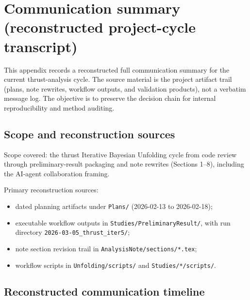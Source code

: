\section{Communication summary (reconstructed project-cycle transcript)}
\label{sec:app_communication_summary}

This appendix records a reconstructed full communication summary for the current thrust-analysis cycle.
The source material is the project artifact trail (plans, note rewrites, workflow outputs, and validation products), not a verbatim message log.
The objective is to preserve the decision chain for internal reproducibility and method auditing.

\subsection{Scope and reconstruction sources}

Scope covered: the thrust Iterative Bayesian Unfolding cycle from code review through preliminary-result packaging and note rewrites (Sections 1--8), including the AI-agent collaboration framing.

Primary reconstruction sources:
\begin{itemize}
\item dated planning artifacts under \texttt{Plans/} (2026-02-13 to 2026-02-18);
\item executable workflow outputs in \texttt{Studies/PreliminaryResult/}, with run directory \texttt{2026-03-05\_thrust\_iter5/};
\item note section revision trail in \texttt{AnalysisNote/sections/*.tex};
\item workflow scripts in \texttt{Unfolding/scripts/} and \texttt{Studies/*/scripts/}.
\end{itemize}

\subsection{Reconstructed communication timeline}

